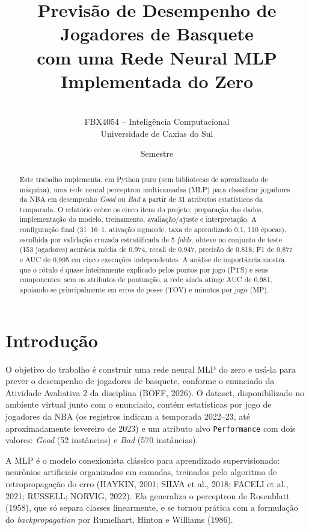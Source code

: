 \documentclass[11pt,a4paper]{article}
\title{\textbf{Previsão de Desempenho de Jogadores de Basquete\\com uma Rede Neural MLP Implementada do Zero}}
\author{\alunos\\[4pt]\small FBX4054 -- Inteligência Computacional\\\small Universidade de Caxias do Sul}
\date{\small Semestre \semestre}
\begin{document}
\maketitle

\begin{abstract}
Este trabalho implementa, em Python puro (sem bibliotecas de aprendizado de máquina), uma rede neural
perceptron multicamadas (MLP) para classificar jogadores da NBA em desempenho \emph{Good} ou \emph{Bad}
a partir de 31 atributos estatísticos da temporada. O relatório cobre os cinco itens do projeto:
preparação dos dados, implementação do modelo, treinamento, avaliação/ajuste e interpretação.
A configuração final (31--16--1, ativação sigmoide, taxa de aprendizado 0,1, 110 épocas), escolhida
por validação cruzada estratificada de 5 \emph{folds}, obteve no conjunto de teste (153 jogadores) acurácia
média de 0,974, recall de 0,947, precisão de 0,818, F1 de 0,877 e AUC de 0,995 em cinco execuções
independentes. A análise de importância mostra que o rótulo é quase inteiramente explicado pelos pontos
por jogo (PTS) e seus componentes; sem os atributos de pontuação, a rede ainda atinge AUC de 0,981,
apoiando-se principalmente em erros de posse (TOV) e minutos por jogo (MP).
\end{abstract}

\tableofcontents
\vspace{1em}

\section{Introdução}
O objetivo do trabalho é construir uma rede neural MLP do zero e usá-la para prever o desempenho de
jogadores de basquete, conforme o enunciado da Atividade Avaliativa 2 da disciplina (BOFF, 2026). O dataset,
disponibilizado no ambiente virtual junto com o enunciado, contém estatísticas por jogo de jogadores da NBA
(os registros indicam a temporada 2022--23, até aproximadamente fevereiro de 2023) e um atributo alvo
\texttt{Performance} com dois valores: \emph{Good} (52 instâncias) e \emph{Bad} (570 instâncias).

A MLP é o modelo conexionista clássico para aprendizado supervisionado: neurônios artificiais organizados em
camadas, treinados pelo algoritmo de retropropagação do erro (HAYKIN, 2001; SILVA et al., 2018;
FACELI et al., 2021; RUSSELL; NORVIG, 2022). Ela generaliza o perceptron de Rosenblatt (1958), que só separa classes linearmente,
e se tornou prática com a formulação do \emph{backpropagation} por Rumelhart, Hinton e Williams (1986).
\end{document}
